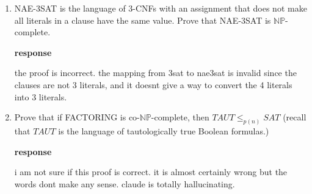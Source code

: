 \documentclass{article}
\newcommand{\coNP}{\textrm{co-}\mathbb{NP}}
\begin{document}
\begin{enumerate}
    \item NAE-3SAT is the language of 3-CNFs with an assignment that does not make all literals in a clause have the same value.
    Prove that NAE-3SAT is $\mathbb{NP}$-complete. 

    \textbf{response}

    the proof is incorrect. the mapping from 3sat to nae3sat is invalid since the clauses are not 3 literals, and it doesnt give a way to convert the 4 literals into 3 literals.



    \item Prove that if FACTORING is $\coNP$-complete, then $TAUT \leq_{p(n)} SAT$ (recall
    that $TAUT$ is the language of tautologically true Boolean formulas.)

    \textbf{response}

    i am not sure if this proof is correct. it is almost certainly wrong but the words dont make any sense. claude is totally hallucinating. 




\end{enumerate}


\newpage
\end{document}
